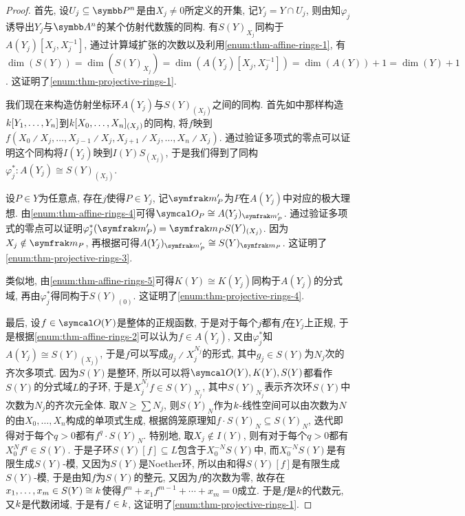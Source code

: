 \begin{proof}
  首先, 设$U_j\subseteq\PP^n$是由$X_j\neq 0$所定义的开集, 记$Y_j=Y\cap U_j$, 则由知$\varphi_j$诱导出$Y_j$与$\AF^n$的某个仿射代数簇的同构. 有$S(Y)_{X_j}$同构于$A(Y_j)[X_j, X_j^{-1}]$, 通过计算域扩张的次数以及利用\ref{enum:thm-affine-rings-1}, 有$\dim (S(Y))=\dim (S(Y)_{X_j})=\dim (A(Y_j)[X_j, X_j^{-1}])=\dim (A(Y))+1=\dim (Y)+1$. 这证明了\ref{enum:thm-projective-rings-1}.

  我们现在来构造仿射坐标环$A(Y_j)$与$S(Y)_{(X_j)}$之间的同构. 首先如中那样构造$k [Y_1, \dotsc, Y_n]$到$k [X_0, \dotsc, X_n]_{(X_j)}$的同构, 将$f$映到$f(X_0{\divslash}X_j, \dotsc, X_{j-1}{\divslash}X_j, X_{j+1}{\divslash}X_j, \dotsc, X_n{\divslash}X_j)$. 通过验证多项式的零点可以证明这个同构将$I(Y_j)$映到$I(Y)S_{(X_j)}$, 于是我们得到了同构$\varphi_j^*\colon A(Y_j)\cong S(Y)_{(X_j)}$.

  设$P\in Y$为任意点, 存在$j$使得$P\in Y_j$, 记$\ideal{m}_P'$为$P$在$A(Y_j)$中对应的极大理想. 由\ref{enum:thm-affine-rings-4}可得$\OO_P\cong A(Y_j)_{\ideal{m}_P'}$. 通过验证多项式的零点可以证明$\varphi_{j}^*(\ideal{m}_P')=\ideal{m}_PS(Y)_{(X_j)}$. 因为$X_j\notin \ideal{m}_P$, 再根据可得$A(Y_j)_{\ideal{m}_P'}\cong S(Y)_{\ideal{m}_P}$. 这证明了\ref{enum:thm-projective-rings-3}.

  类似地, 由\ref{enum:thm-affine-rings-5}可得$K(Y)\cong K(Y_j)$同构于$A(Y_j)$的分式域, 再由$\varphi_j^*$得同构于$S(Y)_{(0)}$. 这证明了\ref{enum:thm-projective-rings-4}.

  最后, 设$f\in\OO (Y)$是整体的正规函数, 于是对于每个$j$都有$f$在$Y_j$上正规, 于是根据\ref{enum:thm-affine-rings-2}可以认为$f\in A(Y_j)$, 又由$\varphi_j^*$知$A(Y_j)\cong S(Y)_{(X_j)}$, 于是$f$可以写成$g_j{\divslash}X_j^{N_j}$的形式, 其中$g_j\in S(Y)$为$N_j$次的齐次多项式. 因为$S(Y)$是整环, 所以可以将$\OO (Y), K(Y), S(Y)$都看作$S(Y)$的分式域$L$的子环, 于是$X_j^{N_j}f\in S(Y)_{N_j}$, 其中$S(Y)_{N_j}$表示齐次环$S(Y)$中次数为$N_j$的齐次元全体. 取$N\geq \sum N_j$, 则$S(Y)_N$作为$k$-线性空间可以由次数为$N$的由$X_0, \dotsc, X_n$构成的单项式生成, 根据鸽笼原理知$f\cdot S(Y)_N\subseteq S(Y)_N$, 迭代即得对于每个$q>0$都有$f^q\cdot S(Y)_N$. 特别地, 取$X_j\notin I(Y)$, 则有对于每个$q>0$都有$X_0^Nf^q\in S(Y)$. 于是子环$S(Y)[f]\subseteq L$包含于$X_0^{-N}S(Y)$中, 而$X_0^{-N}S(Y)$是有限生成$S(Y)$-模, 又因为$S(Y)$是Noether环, 所以由和得$S(Y)[f]$是有限生成$S(Y)$-模, 于是由知$f$为$S(Y)$的整元, 又因为$f$的次数为零, 故存在$x_1, \dotsc, x_m\in S(Y)\cong k$使得$f^m+x_1f^{m-1}+\dotsb +x_m=0$成立. 于是$f$是$k$的代数元, 又$k$是代数闭域, 于是有$f\in k$, 这证明了\ref{enum:thm-projective-rings-1}.
\end{proof}


